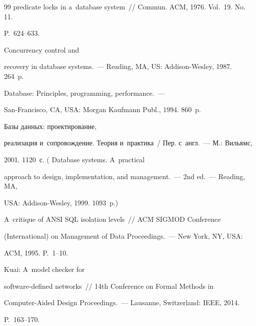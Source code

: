 {{\begin{thebibliography}{99}
predicate locks in a~database system~/\!\!/ Commun. ACM, 1976. Vol.~19. No.\,11. 


P.~624--633. 




     Concurrency control and 


recovery in database systems.~--- Reading, MA, US: Addison-Wesley, 1987. 264~p. 




     Database: Principles, programming, performance.~---  


San-Francisco, CA, USA: Morgan Kaufmann Publ., 1994. 860~p. 




     Базы данных: проектирование, 


реализация и~сопровождение. Теория и~практика~/ Пер. с~англ.~--- М.: Вильямс, 


2001. 1120~с. ( Database systems. A~practical 


approach to design, implementation, and management.~--- 2nd ed.~--- Reading, MA, 


USA: Addison-Wesley, 1999. 1093~p.)






A~critique of ANSI SQL isolation levels~/\!\!/ ACM SIGMOD Conference 


(International) on Management of Data Proceedings.~--- New York, NY, USA: 


ACM, 1995. P.~1--10.




     Kuai: A~model checker for 


    software-defined networks~/\!\!/  14th Conference on Formal Methods in 


Computer-Aided Design Proceedings.~--- Lausanne, Switzerland: IEEE, 2014. 


P.~163--170.


     \end{thebibliography}


} }








